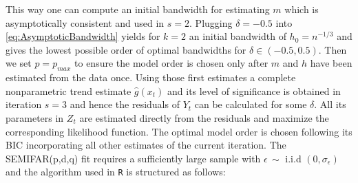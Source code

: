 \documentclass[12pt]{article}
\newcommand{\code}[1]{\texttt{#1}}
\begin{document}
This way one can compute an initial bandwidth for estimating \(m\) which is asymptotically consistent and used in \(s=2\).
Plugging \(\delta = -0.5\) into \eqref{eq:AsymptoticBandwidth} yields for \( k = 2\) an initial bandwidth of \(h_0=n^{-1/3}\) and gives the lowest possible order of optimal bandwidths for \( \delta \in (-0.5,0.5) \).
Then we set \(p=p_{max}\) to ensure the model order is chosen only after  \(m\) and \(h\) have been estimated from the data once.
Using those first estimates a complete nonparametric trend estimate \(\hat{g}(x_t)\) and its level of significance is obtained in iteration \(s=3\) and hence the residuals of \(Y_t\) can be calculated for some \( \delta \). 
All its parameters in \(Z_t\) are estimated directly from the residuals and maximize the corresponding likelihood function. 
The optimal model order is chosen following its BIC incorporating all other estimates of the current iteration.  
The SEMIFAR(p,d,q) fit requires a sufficiently large sample with \(\epsilon\, \sim\) i.i.d \((0,\sigma_{\epsilon})\) and the algorithm used in \code{R} is structured as follows:
\end{document}

